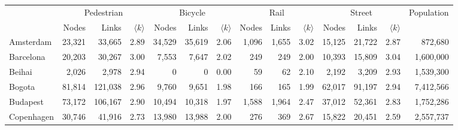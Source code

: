 \begin{table}[ht!]
	\centering
	\begin{adjustbox}{width=\textwidth,keepaspectratio}
		\begin{tabular}{l|rrr|rrr|rrr|rrr|r}
			{}         & \multicolumn{3}{c|}{Pedestrian} & \multicolumn{3}{c|}{Bicycle} & \multicolumn{3}{c|}{Rail} & \multicolumn{3}{c|}{Street} & Population                                                                                                                      \\
			{}         & Nodes                           & Links                        & $\langle k \rangle$       & Nodes                       & Links      & $\langle k \rangle$ & Nodes & Links & $\langle k \rangle$ & Nodes   & Links   & {$\langle k \rangle$}              \\
			\midrule
			Amsterdam  & 23,321                          & 33,665                       & 2.89                      & 34,529                      & 35,619     & 2.06                & 1,096 & 1,655 & 3.02                & 15,125  & 21,722  & 2.87                  & 872,680    \\
			Barcelona  & 20,203                          & 30,267                       & 3.00                      & 7,553                       & 7,647      & 2.02                & 249   & 249   & 2.00                & 10,393  & 15,809  & 3.04                  & 1,600,000  \\
			Beihai     & 2,026                           & 2,978                        & 2.94                      & 0                           & 0          & 0.00                & 59    & 62    & 2.10                & 2,192   & 3,209   & 2.93                  & 1,539,300  \\
			Bogota     & 81,814                          & 121,038                      & 2.96                      & 9,760                       & 9,651      & 1.98                & 166   & 165   & 1.99                & 62,017  & 91,197  & 2.94                  & 7,412,566  \\
			Budapest   & 73,172                          & 106,167                      & 2.90                      & 10,494                      & 10,318     & 1.97                & 1,588 & 1,964 & 2.47                & 37,012  & 52,361  & 2.83                  & 1,752,286  \\
			Copenhagen & 30,746                          & 41,916                       & 2.73                      & 13,980                      & 13,988     & 2.00                & 276   & 369   & 2.67                & 15,822  & 20,451  & 2.59                  & 2,557,737  \\

\end{tabular}
\end{adjustbox}
\end{table}
